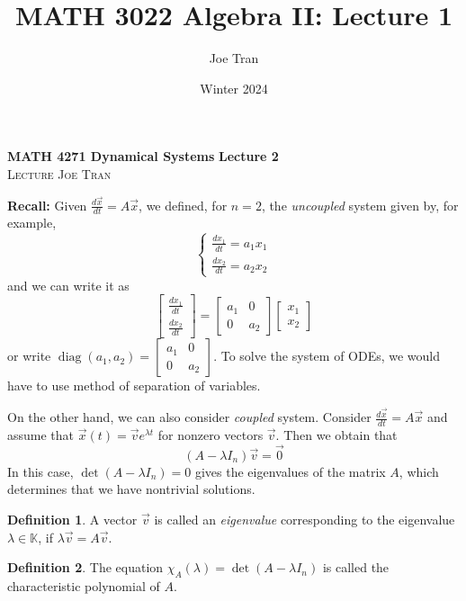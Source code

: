 \documentclass[11pt]{amsart}
\title{MATH 3022 Algebra II: Lecture 1}
\author{Joe Tran}
\date{Winter 2024}
\theoremstyle{definition}\newtheorem{definition}{Definition}
\theoremstyle{definition}\newtheorem{notation}{Notation}
\theoremstyle{definition}\newtheorem{example}{Example}
\theoremstyle{theorem}\newtheorem{theorem}{Theorem}
\theoremstyle{theorem}\newtheorem{corollary}{Corollary}
\theoremstyle{theorem}\newtheorem{proposition}{Proposition}
\theoremstyle{theorem}\newtheorem{lemma}{Lemma}
\theoremstyle{theorem}\newtheorem{question}{Question}
\theoremstyle{remark}\newtheorem{remark}{Remark}
\newcommand{\K}{\mathbb{K}}
\DeclareMathOperator{\diag}{diag}
\begin{document}
\textbf{MATH 4271 Dynamical Systems} \hfill \textbf{Lecture 2} \\
\textsc{Lecture} \hfill \textsc{Joe Tran}

\textbf{Recall:} Given $\frac{d\vec{x}}{dt} = A\vec{x}$, we defined, for $n = 2$, the \emph{uncoupled} system given by, for example,
\begin{equation*}
    \begin{cases}
        \frac{dx_1}{dt} = a_1 x_1 \\
        \frac{dx_2}{dt} = a_2 x_2
    \end{cases}
\end{equation*}
and we can write it as
\begin{equation*}
    \begin{bmatrix} \frac{dx_1}{dt} \\ \frac{dx_2}{dt} \end{bmatrix} = \begin{bmatrix} a_1 & 0 \\ 0 & a_2 \end{bmatrix} \begin{bmatrix} x_1 \\ x_2 \end{bmatrix}
\end{equation*}
or write $\diag(a_1, a_2) = \begin{bmatrix} a_1 & 0 \\ 0 & a_2 \end{bmatrix}$.  To solve the system of ODEs, we would have to use method of separation of variables.

On the other hand, we can also consider \emph{coupled} system. Consider $\frac{d\vec{x}}{dt} = A\vec{x}$ and assume that $\vec{x}(t) = \vec{v}e^{\lambda t}$ for nonzero vectors $\vec{v}$. Then we obtain that
\begin{equation*}
    (A - \lambda I_n)\vec{v} = \vec{0}
\end{equation*}
In this case, $\det(A - \lambda I_n) = 0$ gives the eigenvalues of the matrix $A$, which determines that we have nontrivial solutions.

\begin{definition}\label{definition:1}
    A vector $\vec{v}$ is called an \emph{eigenvalue} corresponding to the eigenvalue $\lambda \in \K$, if $\lambda \vec{v} = A\vec{v}$.
\end{definition}

\begin{definition}\label{definition:2}
    The equation $\chi_A(\lambda) = \det(A - \lambda I_n)$ is called the characteristic polynomial of $A$.
\end{definition}
\end{document}
